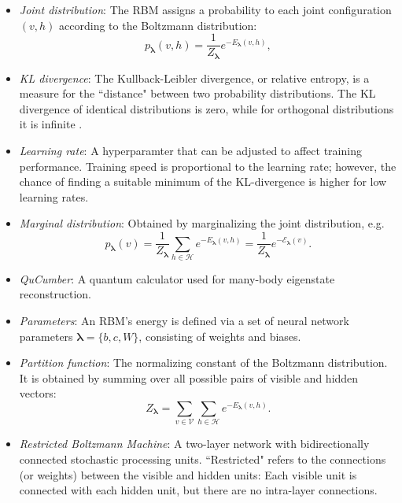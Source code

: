 \documentclass[submission, Phys, hidelinks]{SciPost}
\begin{document}
\begin{itemize}
	\item {\it Joint distribution}: The RBM assigns a probability to each joint configuration $(v,h)$ according to the Boltzmann distribution:
	   \begin{equation}
		   p_{\bm{\lambda}}(v,h) = \frac{1}{Z_{\bm{\lambda}}} e^{-E_{\bm{\lambda}}(v,h)},
	   \end{equation}
	   
	   \item{\it KL divergence}: The Kullback-Leibler divergence, or relative entropy, is a measure for the ``distance" between two probability distributions. The KL divergence of identical distributions is zero, while for orthogonal distributions it is infinite .

\item{\it Learning rate}: A hyperparamter that can be adjusted to affect training performance. Training speed is proportional to the learning rate; however, the chance of finding a suitable minimum of the KL-divergence is higher for low learning rates.


	\item {\it Marginal distribution}: Obtained by marginalizing the joint distribution, e.g.
	   \begin{equation}
		   \label{Eq:marginal_distribution}
		   p_{\bm{\lambda}}(v) = \frac{1}{Z_{\bm{\lambda}}} \sum\limits_{h\in \mathcal{H}} e^{-E_{\bm{\lambda}}(v,h)} = \frac{1}{Z_{\bm{\lambda}}} e^{- \mathcal{E}_{\bm{\lambda}}(v)}.
	   \end{equation}

	\item {\it QuCumber}: A quantum calculator used for many-body eigenstate reconstruction.

	\item {\it Parameters}: An RBM's energy is defined via a set of neural network parameters $\bm{\lambda} = \{b,c,W\}$, consisting of weights and biases.

	\item {\it Partition function}: The normalizing constant of the Boltzmann distribution. It is obtained by summing over all possible pairs of visible and hidden vectors:
	   \begin{equation}
		   Z_{\bm{\lambda}} = \sum\limits_{v\in \mathcal{V}}\sum\limits_{h\in \mathcal{H}} e^{-E_{\bm{\lambda}}(v,h)}.
	   \end{equation}

	\item {\it Restricted Boltzmann Machine}: A two-layer network with bidirectionally connected stochastic processing units. ``Restricted" refers to the connections (or weights) between the visible and hidden units: Each visible unit is connected with each hidden unit, but there are no intra-layer connections.


\end{itemize}
\end{document}
